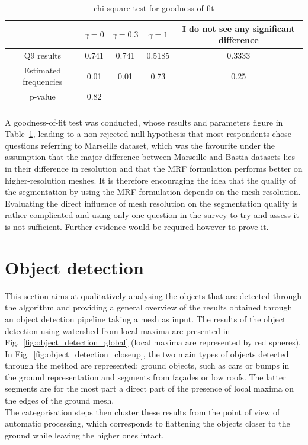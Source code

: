 \documentclass{kththesis}
\begin{document}
\begin{table}
\begin{tabular}{|c|c|c|c|c|}
\hline
& $\gamma = 0$ & $\gamma=0.3$ & $\gamma=1$ &I do not see any significant difference \\
\hline
Q9 results & 0.741 & 0.741 & 0.5185 & 0.3333 \\
\hline
Estimated frequencies &  0.01 & 0.01 & 0.73 & 0.25 \\
\hline
\hline
p-value & 0.82 \\
\caption{chi-square test for
goodness-of-fit }
\end{tabular}

\label{tab:hyp_test_q9}
\end{table}
A goodness-of-fit test was conducted, whose results and parameters figure in Table~\ref{tab:hyp_test_q9}, leading to a non-rejected null hypothesis that most respondents chose questions referring to Marseille dataset, which was the favourite under the assumption that the major difference between Marseille and Bastia datasets lies in their difference in resolution and that the MRF formulation performs better on higher-resolution meshes. It is therefore encouraging the idea that the quality of the segmentation by using the MRF formulation depends on the mesh resolution.  \\
Evaluating the direct influence of mesh resolution on the segmentation quality is rather complicated and using only one question in the survey to try and assess it is not sufficient. Further evidence would be required however to prove it. 
\section{Object detection}
This section aims at qualitatively analysing the objects that are detected through the algorithm and providing a general overview of the results obtained through an object detection pipeline taking a mesh as input. The results of the object detection using watershed from local maxima are presented in Fig.~\ref{fig:object_detection_global} (local maxima are represented by red spheres). \\
In Fig.~\ref{fig:object_detection_closeup}, the  two main types of objects detected through the method are represented: ground objects, such as cars or bumps in the ground representation and segments from façades or low roofs. The latter segments are for the most part a direct part of the presence of local maxima on the edges of the ground mesh.  \\
The categorisation steps then cluster these results from the point of view of automatic processing, which corresponds to flattening the objects closer to the ground while leaving the higher ones intact. 
\end{document}
